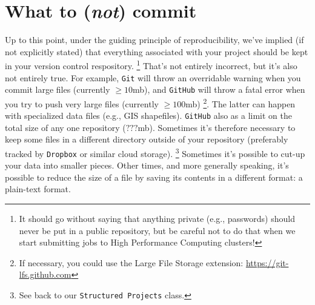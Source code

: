 \documentclass[12pt,letterpaper]{article}
\begin{document}
\section{What to (\emph{not}) commit}

Up to this point, under the guiding principle of reproducibility, 
we've implied (if not explicitly stated) that everything associated with your 
project should be kept in your version control respository.
\unskip
\footnote{It should go without saying that anything private (e.g., passwords) 
	should never be put in a public repository, 
	but be careful not to do that when we start submitting jobs to High 
	Performance Computing clusters!}
That's not entirely incorrect, but it's also not entirely true.
For example, \texttt{Git} will throw an overridable warning when you commit 
large files (currently $\ge 10$mb), 
and \texttt{GitHub} will throw a fatal error when you try to push very large files 
(currently $\ge 100$mb)
\unskip
\footnote{If necessary, you could use the Large File Storage extension: 
	\url{https://git-lfs.github.com}}.
The latter can happen with specialized data files (e.g., GIS shapefiles).
\texttt{GitHub} also as a limit on the total size of any one repository ($???$mb).
Sometimes it's therefore necessary to keep some files in a different directory 
outside of your repository
(preferably tracked by \texttt{Dropbox} or similar cloud storage).
\unskip
\footnote{See back to our \texttt{Structured Projects} class.}
Sometimes it's possible to cut-up your data into smaller pieces.
Other times, and more generally speaking, it's possible to reduce the size of a 
file by saving its contents in a different format: a plain-text format.
\end{document}
